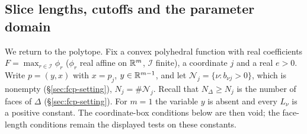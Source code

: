\subsection{Slice lengths, cutoffs and the parameter domain}\label{sec:plc-slice}

We return to the polytope. Fix a convex polyhedral function with real coefficients $F=\max_{r\in\mathcal I}\phi_r$ ($\phi_r$ real affine
on $\mathbb{R}^m$, $\mathcal I$ finite), a coordinate $j$ and a real $e>0$. Write $p=(y,x)$ with $x=p_j$, $y\in\mathbb{R}^{m-1}$, and let
$\mathcal N_j=\{\nu:b_{\nu j}>0\}$, which is nonempty (\S\ref{sec:fcp-setting}), $N_j=\#\mathcal N_j$. Recall that $N_\Delta\ge N_j$ is the number of faces of $\Delta$ (\S\ref{sec:fcp-setting}). For $m=1$ the
variable $y$ is absent and every $L_\nu$ is a positive constant. The coordinate-box conditions below are then void;
the face-length conditions remain the displayed tests on these constants.

